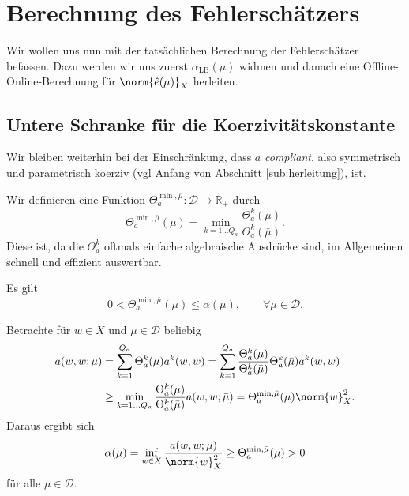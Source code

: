 
\section{Berechnung des Fehlerschätzers} %
\label{sec:berechnung_des_fehlersch_tzers}

Wir wollen uns nun mit der tatsächlichen Berechnung der Fehlerschätzer befassen.
Dazu werden wir uns zuerst $\alpha_\text{LB}(\mu)$ widmen und danach eine Offline-Online-Berechnung für $\norm{\hat e(\mu)}_X$ herleiten.

\subsection{Untere Schranke für die Koerzivitätskonstante} %
\label{sub:untere_schranke_f_r_die_koerzivit_tskonstante}
Wir bleiben weiterhin bei der Einschränkung, dass $a$ \emph{compliant}, also symmetrisch und parametrisch koerziv (vgl Anfang von Abschnitt \ref{sub:herleitung}), ist.

Wir definieren eine Funktion $\Theta_a^{\min,\bar \mu} \colon \mathcal D \to \mathbb{R}_+$ durch
\begin{equation}
    \Theta_a^{\min, \bar \mu}(\mu) = \min_{k = 1 \ldots Q_a} \frac{\Theta_a^k(\mu)}{\Theta_a^k(\bar \mu)}.
\end{equation}
Diese ist, da die $\Theta_a^k$ oftmals einfache algebraische Ausdrücke sind, im Allgemeinen schnell und effizient auswertbar.

\begin{Satz}
    Es gilt
    \begin{equation}
        0 < \Theta_a^{\min, \bar \mu}(\mu) \leq \alpha(\mu), \qquad \forall \mu \in \mathcal D.
    \end{equation}

    \begin{Beweis}
        Betrachte für $w \in X$ und $\mu \in \mathcal D$  beliebig
        \begin{align}
            a(w, w; \mu)
            &= \sum_{k=1}^{Q_a} \Theta_a^k(\mu) a^k(w, w)
            = \sum_{k=1}^{Q_a} \frac{\Theta_a^k(\mu)}{\Theta_a^k(\bar \mu)} \Theta_a^k(\bar \mu) a^k(w, w)
            \\
            &\geq \min_{k = 1 \ldots Q_a} \frac{\Theta_a^k(\mu)}{\Theta_a^k(\bar \mu)} a(w, w; \bar \mu)
            = \Theta_a^{\min, \bar \mu}(\mu) \norm{w}_X^2.
        \end{align}
        Daraus ergibt sich
        \begin{equation}
            \alpha(\mu) = \inf_{w \in X} \frac{a(w, w; \mu)}{\norm{w}^2_X} \geq \Theta_a^{\min, \bar \mu}(\mu) > 0
        \end{equation}
        für alle $\mu \in \mathcal D$.
    \end{Beweis}
\end{Satz}

